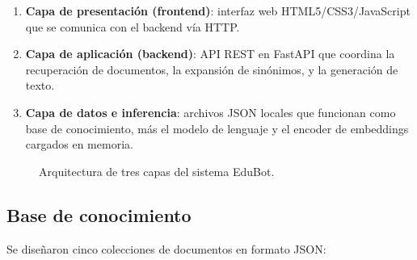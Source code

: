 \begin{enumerate}
    \item \textbf{Capa de presentación (frontend)}: interfaz web HTML5/CSS3/JavaScript que se comunica con el backend vía HTTP.
    \item \textbf{Capa de aplicación (backend)}: API REST en FastAPI que coordina la recuperación de documentos, la expansión de sinónimos, y la generación de texto.
    \item \textbf{Capa de datos e inferencia}: archivos JSON locales que funcionan como base de conocimiento, más el modelo de lenguaje y el encoder de embeddings cargados en memoria.
\end{enumerate}

\begin{figure}[htbp]
    \centering
    \caption{Arquitectura de tres capas del sistema EduBot.}
    \label{fig:arquitectura}
\end{figure}

\subsection{Base de conocimiento}

Se diseñaron cinco colecciones de documentos en formato JSON:

